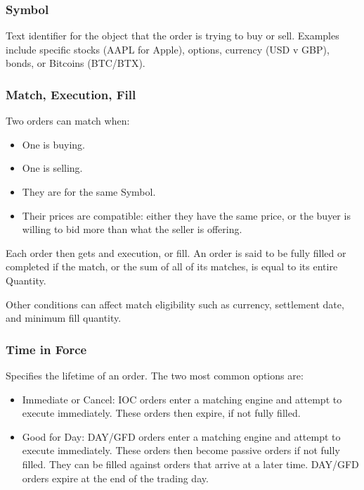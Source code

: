 \documentclass[Letter]{article}
\begin{document}
\subsubsection{Symbol}

Text identifier for the object that the order is trying to buy or sell.
Examples include specific stocks (AAPL for Apple), options, currency
 (USD v GBP), bonds, or Bitcoins (BTC/BTX).

\subsubsection{Match, Execution, Fill}

Two orders can match when:

\begin{itemize}
    \item One is buying.
    \item One is selling.
    \item They are for the same Symbol.
    \item Their prices are compatible: either they have the same price,
    or the buyer is willing to bid more than what the seller is offering.
\end{itemize}

Each order then gets and execution, or fill.  An order is said to
be fully filled or completed if the match, or the sum of all of its
matches, is equal to its entire Quantity.

Other conditions can affect match eligibility such as currency,
settlement date, and minimum fill quantity.

\subsubsection{Time in Force}

Specifies the lifetime of an order.  The two most common options are:

\begin{itemize}
    \item Immediate or Cancel: IOC orders enter a matching engine and
    attempt to execute immediately.  These orders then expire, if not
    fully filled.
    \item Good for Day: DAY/GFD orders enter a matching engine and
    attempt to execute immediately.  These orders then become passive
    orders if not fully filled.  They can be filled against orders that
    arrive at a later time.  DAY/GFD orders expire at the end of the
    trading day.
\end{itemize}
\end{document}
